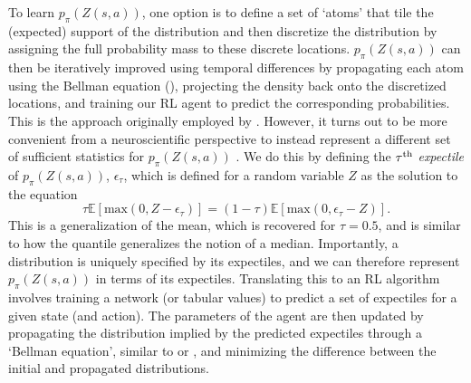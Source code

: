 To learn $p_\pi(Z(s, a))$, one option is to define a set of `atoms' that tile the (expected) support of the distribution and then discretize the distribution by assigning the full probability mass to these discrete locations.
$p_\pi(Z(s, a))$ can then be iteratively improved using temporal differences by propagating each atom using the Bellman equation (), projecting the density back onto the discretized locations, and training our RL agent to predict the corresponding probabilities.
This is the approach originally employed by \citet{bellemare2017distributional}.
However, it turns out to be more convenient from a neuroscientific perspective to instead represent a different set of sufficient statistics for $p_\pi(Z(s, a))$ \citep{dabney2020distributional,lowet2020distributional}.
We do this by defining the $\tau\textsuperscript{th}$ \emph{expectile} of $p_\pi(Z(s, a))$, $\epsilon_\tau$, which is defined for a random variable $Z$ as the solution to the equation
\begin{equation}
    \tau \mathbb{E} [\text{max}(0, Z - \epsilon_\tau)] = (1-\tau) \mathbb{E} [\text{max}(0, \epsilon_\tau - Z)].
\end{equation}
This is a generalization of the mean, which is recovered for $\tau = 0.5$, and is similar to how the quantile generalizes the notion of a median.
Importantly, a distribution is uniquely specified by its expectiles, and we can therefore represent $p_\pi(Z(s, a))$ in terms of its expectiles.
Translating this to an RL algorithm involves training a network (or tabular values) to predict a set of expectiles for a given state (and action).
The parameters of the agent are then updated by propagating the distribution implied by the predicted expectiles through a `Bellman equation', similar to  or , and minimizing the difference between the initial and propagated distributions.

